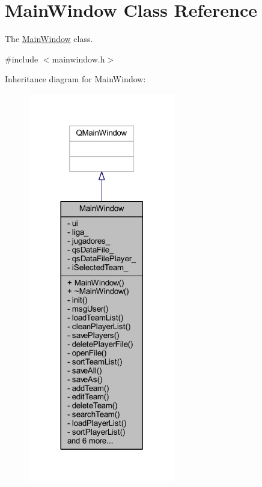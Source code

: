 \hypertarget{class_main_window}{}\section{Main\+Window Class Reference}
\label{class_main_window}


The \hyperlink{class_main_window}{Main\+Window} class.  




{\ttfamily \#include $<$mainwindow.\+h$>$}



Inheritance diagram for Main\+Window\+:
\nopagebreak
\begin{figure}[H]
\begin{center}
\leavevmode
\includegraphics[width=182pt]{de/d4b/class_main_window__inherit__graph}
\end{center}
\end{figure}


